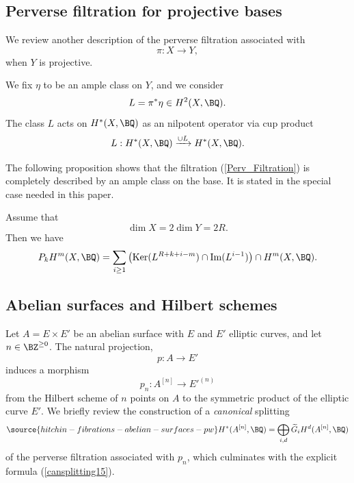 \subsection{Perverse filtration for projective bases}
We review another description of the perverse filtration associated with
\[
\pi: X \to Y,
\]
when $Y$ is projective.

We fix $\eta$ to be an ample class on $Y$, and we consider
\[
L = \pi^* \eta \in H^2(X, \BQ).
\]
The class $L$ acts on $H^*(X, \BQ)$ as an nilpotent operator via cup product
\[
L: H^*(X, \BQ) \xrightarrow{\cup L} H^*(X, \BQ).
\]

The following proposition shows that the filtration (\ref{Perv_Filtration}) is completely described by an ample class on the base.  It is stated in the special case needed in this paper.


\begin{prop}
\notready \label{prop1.1}
Assume that
\begin{equation*}
\dim X = 2 \dim Y = 2R.
\end{equation*}
Then we have
\[
P_kH^m(X, \BQ) = \sum_{i\geq 1} \left(
\mathrm{Ker}(L^{R+k+i-m}) \cap \mathrm{Im}(L^{i-1}) \right) \cap H^m(X, \BQ).
\]
\end{prop}



\subsection{Abelian surfaces and Hilbert schemes}\label{Section1.5}
Let $A = E \times E'$ be an abelian surface with $E$ and $E'$ elliptic curves, and let $n \in \BZ^{\geq 0}$.
The natural projection,
\[
p: A \to E'
\]
induces a morphism
\[
p_n: A^{[n]} \to {E'}^{(n)}
\]
from the Hilbert scheme of $n$ points on $A$ to the symmetric product of the elliptic curve $E'$.
We briefly review the construction \cite{SZ} of a  \emph{canonical} splitting
\begin{equation}\label{canonical_split}
\source{hitchin-fibrations-abelian-surfaces-pw}
H^\ast(A^{[n]}, \BQ) = \bigoplus_{i,d}\widetilde{G}_iH^d(A^{[n]},\BQ)
\end{equation}
of the perverse filtration associated with $p_n$, which culminates with  the explicit formula (\ref{cansplitting15}).

